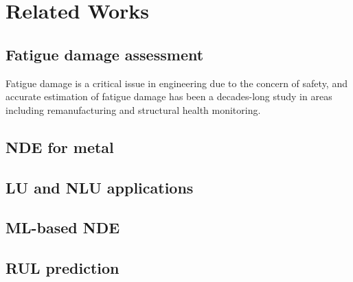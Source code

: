 \chapter{Related Works}
\label{chap: relwork}

\section{Fatigue damage assessment}
Fatigue damage is a critical issue in engineering due to the concern of safety, and accurate estimation of fatigue damage has been a decades-long study in areas including remanufacturing and structural health monitoring. \cite{Santecchia2016}

\section{NDE for metal}
\section{LU and NLU applications}
\section{ML-based NDE}
\section{RUL prediction}